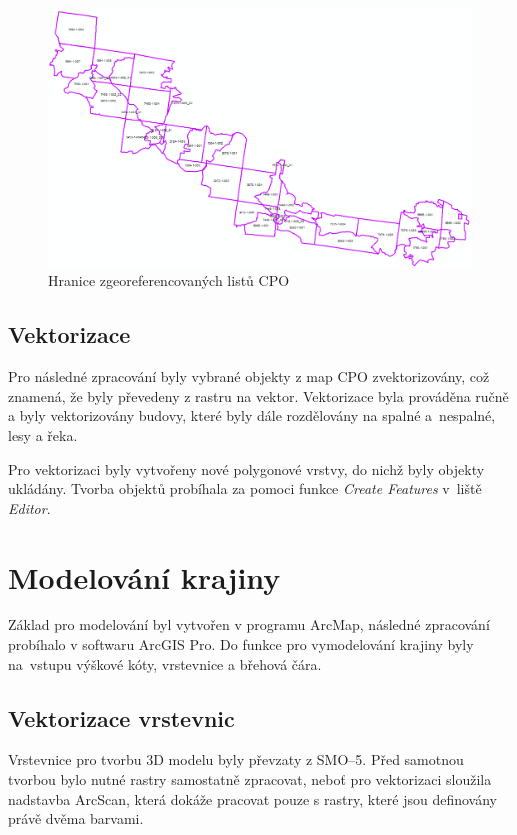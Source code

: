 \documentclass[thesis=M,czech]{FITthesis}[2012/06/26]
\begin{document}
\begin{figure}[h]
	\centering
	\includegraphics[width=17cm]{pics/klad_CPO.png}
	\caption{Hranice zgeoreferencovaných listů CPO}
	\label{obrazek:CPO_viz}
\end{figure}

\subsection{Vektorizace}
Pro následné zpracování byly vybrané objekty z map CPO zvektorizovány, což znamená, že byly převedeny z rastru na vektor. Vektorizace byla prováděna ručně a byly vektorizovány budovy, které byly dále rozdělovány na spalné a~nespalné, lesy a řeka. 

Pro vektorizaci byly vytvořeny nové polygonové vrstvy, do nichž byly objekty ukládány. Tvorba objektů probíhala za pomoci funkce \textit{Create Features} v~liště \textit{Editor}. 


\section{Modelování krajiny}
Základ pro modelování byl vytvořen v programu ArcMap, následné zpracování probíhalo v softwaru ArcGIS Pro. Do funkce pro vymodelování krajiny byly na~vstupu výškové kóty, vrstevnice a břehová čára.

\subsection{Vektorizace vrstevnic}
Vrstevnice pro tvorbu 3D modelu byly převzaty z SMO–5. Před samotnou tvorbou bylo nutné rastry samostatně zpracovat, neboť pro vektorizaci sloužila nadstavba ArcScan, která dokáže pracovat pouze s rastry, které jsou definovány právě dvěma barvami. 
\end{document}
